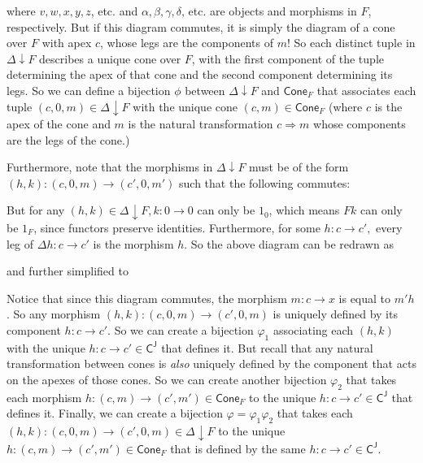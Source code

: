 \documentclass[main.tex]{subfiles}
\begin{document}
\noindent where $ v, w, x, y, z $, etc. and $ \alpha, \beta, \gamma, \delta $, etc. are objects and morphisms in $ F $, respectively. But if this diagram commutes, it is simply the diagram of a cone over $ F $ with apex $ c $, whose legs are the components of $ m $! So each distinct tuple in  $ \Delta \downarrow F $ describes a unique cone over $ F $, with the first component of the tuple determining the apex of that cone and the second component determining its legs. So we can define a bijection $ \phi $ between $ \Delta \downarrow F $ and $ \mathsf{Cone}_F $ that associates each tuple $ (c, 0, m) \in \Delta \downarrow F $ with the unique cone $ (c, m) \in \mathsf{Cone}_F $ (where $ c $ is the apex of the cone and $ m $ is the natural transformation $ c \Rightarrow m $ whose components are the legs of the cone.)

Furthermore, note that the morphisms in $ \Delta \downarrow F $ must be of the form $ (h,k) \colon (c, 0, m) \to (c', 0, m') $ such that the following commutes:


But for any $ (h,k) \in \Delta \downarrow F, k \colon 0 \to 0 $ can only be $ 1_0 $, which means $ Fk $ can only be $ 1_F $, since functors preserve identities. Furthermore, for some $ h \colon c \to c',$ every leg of $\Delta h \colon c \to c'$ is the morphism $ h $. So the above diagram can be redrawn as


\noindent and further simplified to



Notice that since this diagram commutes, the morphism $ m \colon c \to x $ is equal to $ m'h $. So any morphism $ (h,k) \colon (c, 0, m) \to (c', 0, m) $ is uniquely defined by its component $ h \colon c \to c' $. So we can create a bijection $ \varphi_1 $ associating each $ (h,k) $ with the unique $ h \colon c \to c' \in \mathsf{C^J} $ that defines it. But recall that any natural transformation between cones is \textit{also} uniquely defined by the component that acts on the apexes of those cones. So we can create another bijection $ \varphi_2 $ that takes each morphism $ h \colon (c, m) \to (c', m') \in \mathsf{Cone}_F $ to the unique $ h \colon c \to c' \in \mathsf{C^J} $ that defines it. Finally, we can create a bijection $ \varphi = \varphi_1 \varphi_2 $ that takes each $ (h,k) \colon (c, 0, m) \to (c', 0, m) \in \Delta \downarrow F $ to the unique $ h \colon (c, m) \to (c', m') \in \mathsf{Cone}_F $ that is defined by the same $ h \colon c \to c' \in \mathsf{C^J} $. 
\end{document}

